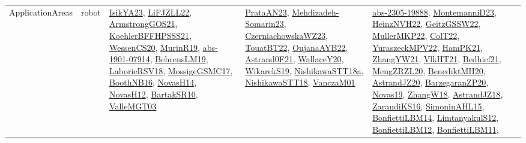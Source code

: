 {\begin{longtable}{lp{3cm}>{\raggedright}p{6cm}>{\raggedright}p{6cm}p{8cm}}
ApplicationAreas & robot & \href{articles/IsikYA23.pdf}{IsikYA23}\cite{IsikYA23}, \href{papers/LiFJZLL22.pdf}{LiFJZLL22}\cite{LiFJZLL22}, \href{papers/ArmstrongGOS21.pdf}{ArmstrongGOS21}\cite{ArmstrongGOS21}, \href{articles/KoehlerBFFHPSSS21.pdf}{KoehlerBFFHPSSS21}\cite{KoehlerBFFHPSSS21}, \href{papers/WessenCS20.pdf}{WessenCS20}\cite{WessenCS20}, \href{papers/MurinR19.pdf}{MurinR19}\cite{MurinR19}, \href{articles/abs-1901-07914.pdf}{abs-1901-07914}\cite{abs-1901-07914}, \href{papers/BehrensLM19.pdf}{BehrensLM19}\cite{BehrensLM19}, \href{articles/LaborieRSV18.pdf}{LaborieRSV18}\cite{LaborieRSV18}, \href{papers/MossigeGSMC17.pdf}{MossigeGSMC17}\cite{MossigeGSMC17}, \href{papers/BoothNB16.pdf}{BoothNB16}\cite{BoothNB16}, \href{articles/NovasH14.pdf}{NovasH14}\cite{NovasH14}, \href{articles/NovasH12.pdf}{NovasH12}\cite{NovasH12}, \href{articles/BartakSR10.pdf}{BartakSR10}\cite{BartakSR10}, \href{papers/ValleMGT03.pdf}{ValleMGT03}\cite{ValleMGT03} & \href{articles/PrataAN23.pdf}{PrataAN23}\cite{PrataAN23}, \href{papers/Mehdizadeh-Somarin23.pdf}{Mehdizadeh-Somarin23}\cite{Mehdizadeh-Somarin23}, \href{articles/CzerniachowskaWZ23.pdf}{CzerniachowskaWZ23}\cite{CzerniachowskaWZ23}, \href{papers/TouatBT22.pdf}{TouatBT22}\cite{TouatBT22}, \href{papers/OujanaAYB22.pdf}{OujanaAYB22}\cite{OujanaAYB22}, \href{papers/Astrand0F21.pdf}{Astrand0F21}\cite{Astrand0F21}, \href{articles/WallaceY20.pdf}{WallaceY20}\cite{WallaceY20}, \href{articles/WikarekS19.pdf}{WikarekS19}\cite{WikarekS19}, \href{papers/NishikawaSTT18a.pdf}{NishikawaSTT18a}\cite{NishikawaSTT18a}, \href{papers/NishikawaSTT18.pdf}{NishikawaSTT18}\cite{NishikawaSTT18}, \href{papers/VanczaM01.pdf}{VanczaM01}\cite{VanczaM01} & \href{articles/abs-2305-19888.pdf}{abs-2305-19888}\cite{abs-2305-19888}, \href{articles/MontemanniD23.pdf}{MontemanniD23}\cite{MontemanniD23}, \href{articles/HeinzNVH22.pdf}{HeinzNVH22}\cite{HeinzNVH22}, \href{papers/GeitzGSSW22.pdf}{GeitzGSSW22}\cite{GeitzGSSW22}, \href{articles/MullerMKP22.pdf}{MullerMKP22}\cite{MullerMKP22}, \href{articles/ColT22.pdf}{ColT22}\cite{ColT22}, \href{articles/YuraszeckMPV22.pdf}{YuraszeckMPV22}\cite{YuraszeckMPV22}, \href{articles/HamPK21.pdf}{HamPK21}\cite{HamPK21}, \href{articles/ZhangYW21.pdf}{ZhangYW21}\cite{ZhangYW21}, \href{articles/VlkHT21.pdf}{VlkHT21}\cite{VlkHT21}, \href{articles/Bedhief21.pdf}{Bedhief21}\cite{Bedhief21}, \href{articles/MengZRZL20.pdf}{MengZRZL20}\cite{MengZRZL20}, \href{articles/BenediktMH20.pdf}{BenediktMH20}\cite{BenediktMH20}, \href{articles/AstrandJZ20.pdf}{AstrandJZ20}\cite{AstrandJZ20}, \href{papers/BarzegaranZP20.pdf}{BarzegaranZP20}\cite{BarzegaranZP20}, \href{articles/Novas19.pdf}{Novas19}\cite{Novas19}, \href{articles/ZhangW18.pdf}{ZhangW18}\cite{ZhangW18}, \href{papers/AstrandJZ18.pdf}{AstrandJZ18}\cite{AstrandJZ18}, \href{articles/ZarandiKS16.pdf}{ZarandiKS16}\cite{ZarandiKS16}, \href{articles/SimoninAHL15.pdf}{SimoninAHL15}\cite{SimoninAHL15}, \href{articles/BonfiettiLBM14.pdf}{BonfiettiLBM14}\cite{BonfiettiLBM14}, \href{articles/LimtanyakulS12.pdf}{LimtanyakulS12}\cite{LimtanyakulS12}, \href{papers/BonfiettiLBM12.pdf}{BonfiettiLBM12}\cite{BonfiettiLBM12}, \href{papers/BonfiettiLBM11.pdf}{BonfiettiLBM11}\cite{BonfiettiLBM11}, 
\end{longtable}}
